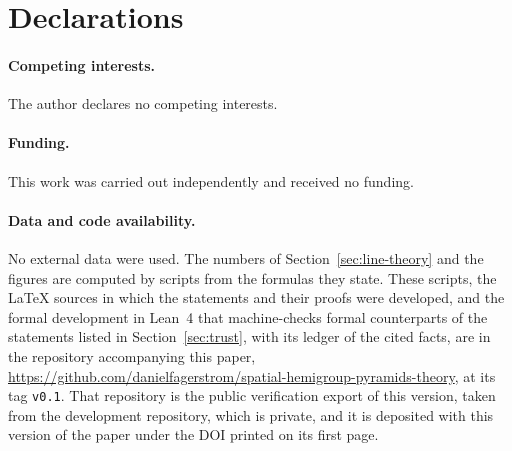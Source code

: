 \section*{Declarations}

\paragraph{Competing interests.} The author declares no competing interests.

\paragraph{Funding.} This work was carried out independently and received no funding.

\paragraph{Data and code availability.} No external data were used. The numbers of
Section~\ref{sec:line-theory} and the figures are computed by scripts from the formulas they state.
These scripts, the LaTeX sources in which the statements and
their proofs were developed, and the formal development in Lean~4 that machine-checks formal
counterparts of the statements listed in Section~\ref{sec:trust}, with its ledger of the cited facts,
are in the repository accompanying this paper,
\url{https://github.com/danielfagerstrom/spatial-hemigroup-pyramids-theory}, at its tag
\texttt{v0.1}. That repository is the public verification export of this version, taken from the
development repository, which is private, and it is deposited with this version of the paper under
the DOI printed on its first page.
